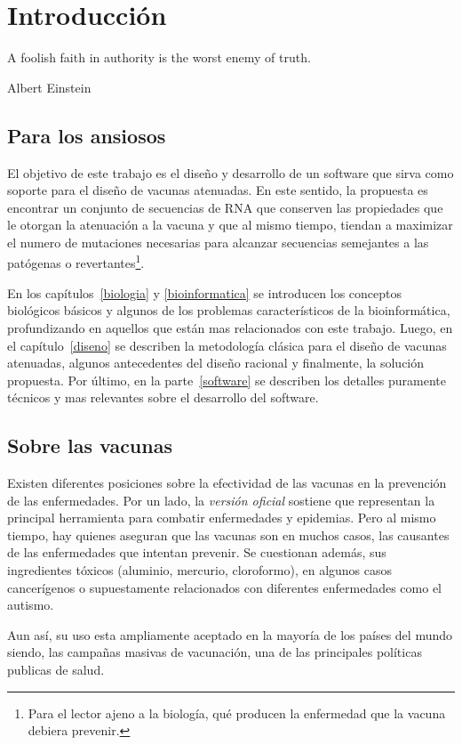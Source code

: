 \chapter{Introducci\'on}
\epigraph{A foolish faith in authority is the worst enemy of truth.}%
         {Albert Einstein}

\section{Para los ansiosos}
El objetivo de este trabajo es el dise\~no y desarrollo de un software que
sirva como soporte para el dise\~no de vacunas atenuadas. En este sentido, la
propuesta es encontrar un conjunto de secuencias de \ac{RNA} que conserven las
propiedades que le otorgan la atenuaci\'on a la vacuna y que al mismo tiempo,
tiendan a maximizar el numero de mutaciones necesarias para alcanzar secuencias
semejantes a las pat\'ogenas o revertantes\footnote{Para el lector ajeno a la
biolog\'ia, qu\'e producen la enfermedad que la vacuna debiera prevenir.}. 

En los cap\'itulos~\ref{biologia} y \ref{bioinformatica} se introducen los
conceptos biol\'ogicos b\'asicos y algunos de los problemas caracter\'isticos
de la bioinform\'atica, profundizando en aquellos que est\'an mas relacionados
con este trabajo. Luego, en el cap\'itulo~\ref{diseno} se describen la
metodolog\'ia cl\'asica para el dise\~no de vacunas atenuadas, algunos
antecedentes del dise\~no racional y finalmente, la soluci\'on propuesta. Por
\'ultimo, en la parte~\ref{software} se describen los detalles puramente
t\'ecnicos y mas relevantes sobre el desarrollo del software.

\section{Sobre las vacunas}
\label{vacunas}
Existen diferentes posiciones sobre la efectividad de las vacunas en la
prevenci\'on de las enfermedades. Por un lado, la \textit{versi\'on oficial}
sostiene que representan la principal herramienta para combatir enfermedades y
epidemias. Pero al mismo tiempo, hay quienes aseguran que las vacunas son en
muchos casos, las causantes de las enfermedades que intentan prevenir. Se
cuestionan adem\'as, sus ingredientes t\'oxicos (aluminio, mercurio,
cloroformo), en algunos casos cancer\'igenos o supuestamente relacionados con
diferentes enfermedades como el autismo.

Aun as\'i, su uso esta ampliamente aceptado en la mayor\'ia de los pa\'ises del
mundo siendo, las campa\~nas masivas de vacunaci\'on, una de las principales
pol\'iticas publicas de salud. 

